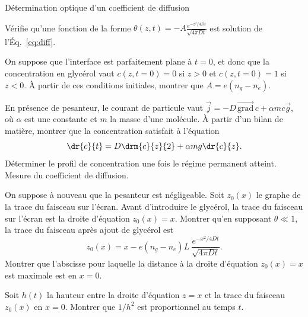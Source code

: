 \begin{exo}[PSI][1]{Détermination optique d'un coefficient de diffusion}
\begin{quest}
\item Vérifie qu'une fonction de la forme $\theta(z,t) = -A \frac{e^{-z^2/4Dt}}{\sqrt{4 \pi Dt}}$ est solution de l'Éq.~\eqref{eq:diff}.

\item On suppose que l'interface est parfaitement plane à $t=0$, et donc que la concentration en glycérol vaut $c(z,t=0)=0$ si $z>0$ et $c(z,t=0)=1$ si $z<0$. À partir de ces conditions initiales, montrer que $A=e(n_g-n_e)$.


\item En présence de pesanteur, le courant de particule vaut $\vec{j} = -D \, \vec{\text{grad}} \, c + \alpha mc \vec{g}$, où $\alpha$ est une constante et $m$ la masse d'une molécule. À partir d'un bilan de matière, montrer que la concentration satisfait à l'équation
\begin{equation}
\dr{c}{t} = D \drm{c}{z}{2} + \alpha mg \dr{c}{z}.
\end{equation}
Déterminer le profil de concentration une fois le régime permanent atteint.\\

Mesure du coefficient de diffusion.

\item On suppose à nouveau que la pesanteur est négligeable. Soit $z_0(x)$ le graphe de la trace du faisceau sur l'écran. Avant d'introduire le glycérol, la trace du faisceau sur l'écran est la droite d'équation $z_0(x)=x$. Montrer qu'en supposant $\theta \ll 1$, la trace du faisceau après ajout de glycérol est
\begin{equation}
z_0(x) = x- e(n_g-n_e)L \ \frac{e^{-x^2/4Dt}}{\sqrt{4 \pi Dt}}.
\end{equation}
Montrer que l'abscisse pour laquelle la distance à la droite d'équation $z_0(x)=x$ est maximale est en $x=0$.

\item Soit $h(t)$ la hauteur entre la droite d'équation $z=x$ et la trace du faisceau $z_0(x)$ en $x=0$. Montrer que $1/h^2$ est proportionnel au temps $t$.


\end{quest}
\end{exo}


